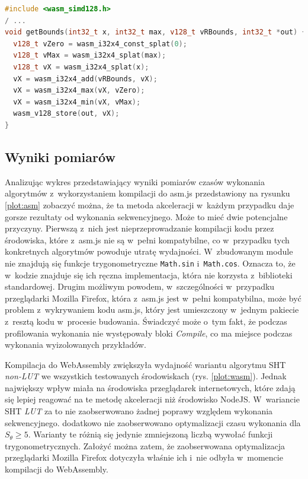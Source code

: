 \begin{lstlisting}[language=C++, float=ht, label=lst:simd, caption=Funkcja \lstinline{getBounds} algorytmu CHT z~wykorzystaniem instrukcji SIMD.]
#include <wasm_simd128.h>
/ ...
void getBounds(int32_t x, int32_t max, v128_t vRBounds, int32_t *out) {
  v128_t vZero = wasm_i32x4_const_splat(0);
  v128_t vMax = wasm_i32x4_splat(max);
  v128_t vX = wasm_i32x4_splat(x);
  vX = wasm_i32x4_add(vRBounds, vX);
  vX = wasm_i32x4_max(vX, vZero);
  vX = wasm_i32x4_min(vX, vMax);
  wasm_v128_store(out, vX);
}
\end{lstlisting}

\subsection{Wyniki pomiarów}

Analizując wykres przedstawiający wyniki pomiarów czasów wykonania algorytmów z~wykorzystaniem kompilacji do asm.js przedstawiony na rysunku \ref{plot:asm} zobaczyć można, że ta metoda akceleracji w~każdym przypadku daje gorsze rezultaty od wykonania sekwencyjnego. Może to mieć dwie potencjalne przyczyny. Pierwszą z~nich jest nieprzeprowadzanie kompilacji kodu przez środowiska, które z~asm.js nie są w~pełni kompatybilne, co w~przypadku tych konkretnych algorytmów powoduje utratę wydajności. W~zbudowanym module nie znajdują się funkcje trygonometryczne \lstinline{Math.sin} i~\lstinline{Math.cos}. Oznacza to, że w~kodzie znajduje się ich ręczna implementacja, która nie korzysta z~biblioteki standardowej. Drugim możliwym powodem, w~szczególności w~przypadku przeglądarki Mozilla Firefox, która z~asm.js jest w~pełni kompatybilna, może być problem z~wykrywaniem kodu asm.js, który jest umieszczony w~jednym pakiecie z~resztą kodu w~procesie budowania. Świadczyć może o~tym fakt, że podczas profilowania wykonania nie występowały bloki \textit{Compile}, co ma miejsce podczas wykonania wyizolowanych przykładów.







Kompilacja do WebAssembly zwiększyła wydajność wariantu algorytmu SHT \textit{non-LUT} we wszystkich testowanych środowiskach (rys. \ref{plot:wasm}). Jednak największy wpływ miała na środowiska przeglądarek internetowych, które zdają się lepiej reagować na te metodę akceleracji niż środowisko NodeJS. W~wariancie SHT \textit{LUT} za to nie zaobserwowano żadnej poprawy względem wykonania sekwencyjnego. dodatkowo nie zaobserwowano optymalizacji czasu wykonania dla $S_\theta \geq 5$. Warianty te różnią się jedynie zmniejszoną liczbą wywołać funkcji trygonometrycznych. Założyć można zatem, że zaobserwowana optymalizacja przeglądarki Mozilla Firefox dotyczyła właśnie ich i~nie odbyła w~momencie kompilacji do WebAssembly. 

